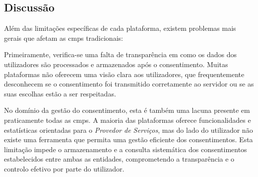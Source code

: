 \label{tab:cmp-caracteristicas}
\begin{table}[H]
\centering
\caption{Comparação das principais características das \acrshort{cmp}s existentes}
\end{table}


\subsection{Discussão}

Além das limitações específicas de cada plataforma, existem problemas mais gerais que afetam as \acrshort{cmp}s tradicionais:

Primeiramente, verifica-se uma falta de transparência em como os dados dos utilizadores são processados e armazenados após o consentimento. Muitas plataformas não oferecem uma visão clara aos utilizadores, que frequentemente desconhecem se o consentimento foi transmitido corretamente ao servidor ou se as suas escolhas estão a ser respeitadas.

No domínio da gestão do consentimento, esta é também uma lacuna presente em praticamente todas as \acrshort{cmp}s. A maioria das plataformas oferece funcionalidades e estatísticas orientadas para o \textit{Provedor de Serviços}, mas do lado do utilizador não existe uma ferramenta que permita uma gestão eficiente dos consentimentos. Esta limitação impede o armazenamento e a consulta sistemática dos consentimentos estabelecidos entre ambas as entidades, comprometendo a transparência e o controlo efetivo por parte do utilizador.

